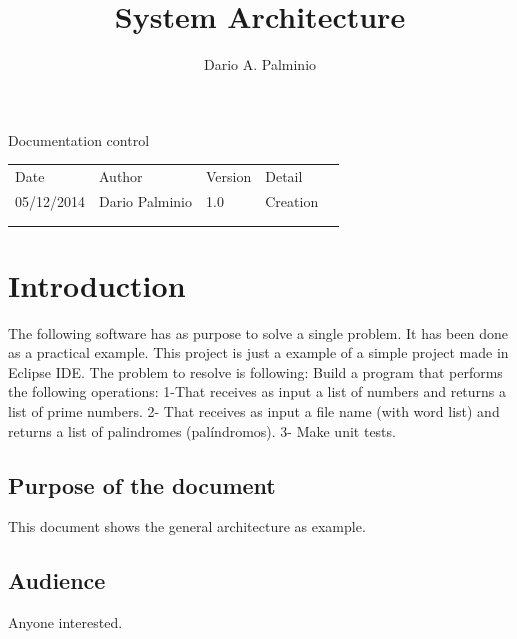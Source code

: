 \documentclass[a4paper,11pt]{book}
\title{System Architecture}
\author{Dario A. Palminio}
\begin{document}
\maketitle

Documentation control

\begin{table}[h]
\begin{tabular}{lllll}
\cline{1-4}
\multicolumn{1}{|l|}{Date}       & \multicolumn{1}{l|}{Author}         & \multicolumn{1}{l|}{Version} & \multicolumn{1}{l|}{Detail}   &  \\ \cline{1-4}
\multicolumn{1}{|l|}{05/12/2014} & \multicolumn{1}{l|}{Dario Palminio} & \multicolumn{1}{l|}{1.0}     & \multicolumn{1}{l|}{Creation} &  \\ \cline{1-4}
                                 &                                     &                              &                               &  \\
                                 &                                     &                              &                               & 
\end{tabular}
\end{table}

\tableofcontents

\chapter{Introduction}

The following software has as purpose to solve a single problem. It has been done as a practical example.
This project is just a example of a simple project made in Eclipse IDE. 
The problem to resolve is following:
Build a program that performs the following operations: 
1-That receives as input a list of numbers and returns a list of prime numbers. 
2- That receives as input a file name (with word list) and returns a list of palindromes (palíndromos). 
3- Make unit tests.

\section{Purpose of the document}
This document shows the general architecture as example.

\section{Audience}
Anyone interested.
\end{document}
